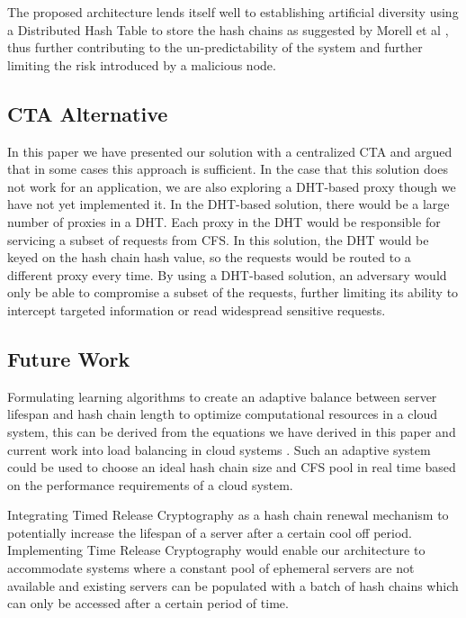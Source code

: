 \documentclass[a4paper,twoside]{article}
\begin{document}
The proposed architecture lends itself well to establishing artificial diversity using a Distributed Hash Table to store the hash chains as suggested by Morell et al \cite{morrell_dht_2015}, thus further contributing to the un-predictability of the system and further limiting the risk introduced by a malicious node. 

\subsection{CTA Alternative}

In this paper we have presented our solution with a centralized CTA and argued that in some cases this approach is sufficient.  In the case that this solution does not work for an application, we are also exploring a DHT-based proxy though we have not yet implemented it.  In the DHT-based solution, there would be a large number of proxies in a DHT.  Each proxy in the DHT would be responsible for servicing a subset of requests from CFS.  In this solution, the DHT would be keyed on the hash chain hash value, so the requests would be routed to a different proxy every time.  By using a DHT-based solution, an adversary would only be able to compromise a subset of the requests, further limiting its ability to intercept targeted information or read widespread sensitive requests.  


\subsection{Future Work}

Formulating learning algorithms to create an adaptive balance between server lifespan and hash chain length to optimize computational resources in a cloud system, this can be derived from the equations we have derived in this paper and current work into load balancing in cloud systems \cite{randles_comparative_2010}. Such an adaptive system could be used to choose an ideal hash chain size and CFS pool in real time based on the performance requirements of a cloud system.

Integrating Timed Release Cryptography \cite{chalkias_timed_2006} as a hash chain renewal mechanism to potentially increase the lifespan of a server after a certain cool off period. Implementing Time Release Cryptography would enable our architecture to accommodate systems where a constant pool of ephemeral servers are not available and existing servers can be populated with a batch of hash chains which can only be accessed after a certain period of time. 
\end{document}
